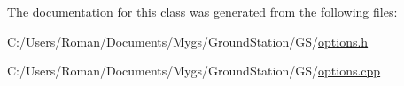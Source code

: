The documentation for this class was generated from the following files\+:\begin{DoxyCompactItemize}
\item 
C\+:/\+Users/\+Roman/\+Documents/\+Mygs/\+Ground\+Station/\+G\+S/\hyperlink{options_8h}{options.\+h}\item 
C\+:/\+Users/\+Roman/\+Documents/\+Mygs/\+Ground\+Station/\+G\+S/\hyperlink{options_8cpp}{options.\+cpp}\end{DoxyCompactItemize}
